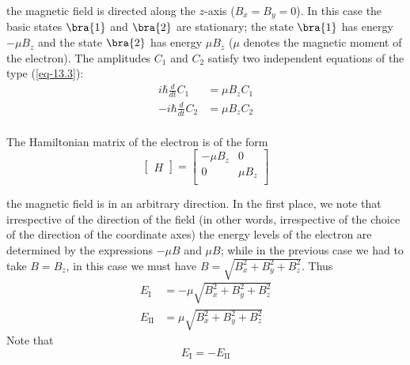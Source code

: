 \documentclass[a4paper,sfsidenotes,colorlinks=true]{tufte-book}
\numberwithin{equation}{section}
\numberwithin{figure}{section}
\begin{document}
\begin{description}[leftmargin=1cm]
\item[First case:] the magnetic field is directed along the $z$-axis
  ($B_{x} = B_{y} = 0$). In this case the basic states $\bra{1}$ and
  $\bra{2}$ are stationary; the state $\bra{1}$ has energy $- \mu
  B_{z}$ and the state $\bra{2}$ has energy $\mu B_{z}$ ($\mu$ denotes
  the magnetic moment of the electron). The amplitudes $C_{1}$ and $C_{2}$
  satisfy two independent equations of the type (\ref{eq-13.3}):
\begin{equation}%
\begin{split}
i \hbar \frac{d}{dt} C_{1} & = \mu B_{z} C_{1} \\
-i \hbar \frac{d}{dt} C_{2} & = \mu B_{z} C_{2} \\
\end{split}
\label{eq-14.1}
\end{equation}

The Hamiltonian matrix of the electron is of the form
\begin{equation}%
\begin{bmatrix}
H
\end{bmatrix}
=
\begin{bmatrix}
- \mu B_{z} & 0 \\
0 & \mu B_{z} \\
\end{bmatrix}
\label{eq-14.2}
\end{equation}



\item[Second case:] the magnetic field is in an arbitrary
  direction. In the first place, we note that irrespective of the
  direction of the field (in other words, irrespective of the choice
  of the direction of the coordinate axes) the energy levels of the
  electron are determined by the expressions $- \mu B$ and $ \mu B$;
  while in the previous case we had to take $B =B_{z}$, in this case
  we must have $B =\sqrt{B_{x}^{2}+ B_{y}^{2} + B_{z}^{2}}$. Thus
\begin{equation}%
\begin{split}
E_{\mathrm{I}} & = - \mu \sqrt{B_{x}^{2}+ B_{y}^{2} + B_{z}^{2}} \\
E_{\mathrm{II}} & = \mu \sqrt{B_{x}^{2}+ B_{y}^{2} + B_{z}^{2}} 
\end{split}
\label{eq-14.3}
\end{equation}
Note that
\begin{equation}%
E_{\mathrm{I}} = - E_{\mathrm{II}} 
\label{eq-14.4}
\end{equation}
\end{description}
\end{document}
